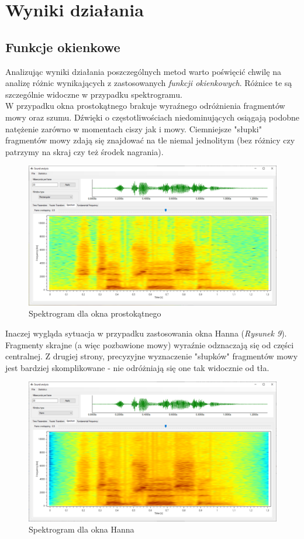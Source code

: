 \documentclass[a4paper]{article}
\begin{document}
\section{Wyniki działania}
\subsection{Funkcje okienkowe}
Analizując wyniki działania poszczególnych metod warto poświęcić chwilę na analizę różnic wynikających z zastosowanych \textit{funkcji okienkowych}. Różnice te są szczególnie widoczne w przypadku spektrogramu.\\
W przypadku okna prostokątnego brakuje wyraźnego odróżnienia fragmentów mowy oraz szumu. Dźwięki o częstotliwościach niedominujących osiągają podobne natężenie zarówno w momentach ciszy jak i mowy. Ciemniejsze "słupki" fragmentów mowy zdają się znajdować na tle niemal jednolitym (bez różnicy czy patrzymy na skraj czy też środek nagrania).
\begin{figure}[H]
  \centering  
  \includegraphics[width=0.86\linewidth]{images/08rectangularWindow.png}
  \caption{Spektrogram dla okna prostokątnego}
\end{figure}
Inaczej wygląda sytuacja w przypadku zastosowania okna Hanna (\textit{Rysunek 9}).\\
Fragmenty skrajne (a więc pozbawione mowy) wyraźnie odznaczają się od części centralnej. Z drugiej strony, precyzyjne wyznaczenie "słupków" fragmentów mowy jest bardziej skomplikowane - nie odróżniają się one tak widocznie od tła.
\begin{figure}[H]
  \centering
  \includegraphics[width=0.86\linewidth]{images/09hannWindow.png}
  \caption{Spektrogram dla okna Hanna}
\end{figure}
\end{document}
